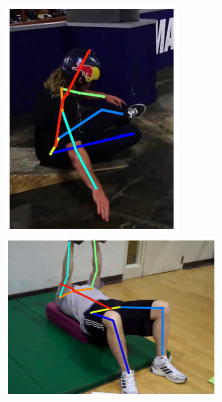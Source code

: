 \begin{figure}[t!]
    \includegraphics[height=\flowh]{resources/Human_Poses/pose/qualitative/pred-3}
    \hfill
    \includegraphics[height=\flowh]{resources/Human_Poses/pose/qualitative/pred-4}
    \hfill

\end{figure}
